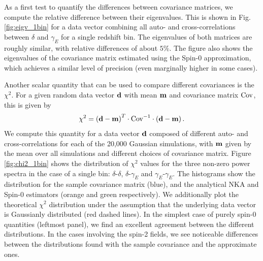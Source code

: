 \documentclass[a4paper,11pt]{article}
\begin{document}
      As a first test to quantify the differences between covariance matrices, we compute the relative difference between their eigenvalues. This is shown in Fig. \ref{fig:eigv_1bin} for a data vector combining all auto- and cross-correlations between $\delta$ and $\gamma_E$ for a single redshift bin. The eigenvalues of both matrices are roughly similar, with relative differences of about $5\%$. The figure also shows the eigenvalues of the covariance matrix estimated using the Spin-0 approximation, which achieves a similar level of precision (even marginally higher in some cases).

      Another scalar quantity that can be used to compare different covariances is the $\chi^2$. For a given random data vector ${\bf d}$ with mean ${\bf m}$ and covariance matrix ${\rm Cov}$, this is given by
      \begin{equation}
        \chi^2=\left({\bf d}-{\bf m}\right)^T\cdot{\rm Cov}^{-1}\cdot\left({\bf d}-{\bf m}\right).
      \end{equation}
      We compute this quantity for a data vector ${\bf d}$ composed of different auto- and cross-correlations for each of the 20,000 Gaussian simulations, with ${\bf m}$ given by the mean over all simulations and different choices of covariance matrix. Figure \ref{fig:chi2_1bin} shows the distribution of $\chi^2$ values for the three non-zero power spectra in the case of a single bin: $\delta$-$\delta$, $\delta$-$\gamma_E$ and $\gamma_E$-$\gamma_E$. The histograms show the distribution for the sample covariance matrix (blue), and the analytical NKA and Spin-0 estimators (orange and green respectively). We additionally plot the theoretical $\chi^2$ distribution under the assumption that the underlying data vector is Gaussianly distributed (red dashed lines). In the simplest case of purely spin-0 quantities (leftmost panel), we find an excellent agreement between the different distributions. In the cases involving the spin-2 fields, we see noticeable differences between the distributions found with the sample covariance and the approximate ones.
\end{document}
